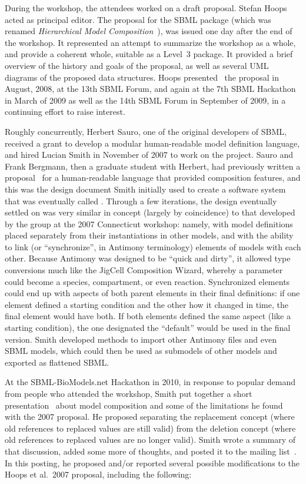 During the workshop, the attendees worked on a draft proposal.  Stefan
Hoops acted as principal editor.  The proposal for the SBML package
(which was renamed \emph{Hierarchical Model
  Composition}~\citep{hoops:2007}), was issued one day after the end of
the workshop.  It represented an attempt to summarize the workshop as a
whole, and provide a coherent whole, suitable as a Level~3 package.  It
provided a brief overview of the history and goals of the proposal, as
well as several UML diagrams of the proposed data structures.  Hoops
presented~\citep{hoops:2008} the proposal in August, 2008, at the 13th
SBML Forum, and again at the 7th SBML Hackathon in March of 2009 as well
as the 14th SBML Forum in September of 2009, in a continuing effort to
raise interest.

Roughly concurrently, Herbert Sauro, one of the original developers of
SBML, received a grant to develop a modular human-readable model
definition language, and hired Lucian Smith in November of 2007 to work
on the project.  Sauro and Frank Bergmann, then a graduate student with
Herbert, had previously written a proposal~\citep{bergmann:2006} for a
human-readable language that provided composition features, and this was
the design document Smith initially used to create a software system
that was eventually called
. Through a few
iterations, the design eventually settled on was very similar in concept
(largely by coincidence) to that developed by the group at the 2007
Connecticut workshop: namely, with model definitions placed separately
from their instantiations in other models, and with the ability to link
(or ``synchronize'', in Antimony terminology) elements of models with
each other.  Because Antimony was designed to be ``quick and dirty'', it
allowed type conversions much like the JigCell Composition Wizard,
whereby a parameter could become a species, compartment, or even
reaction.  Synchronized elements could end up with aspects of both
parent elements in their final definitions: if one element defined a
starting condition and the other how it changed in time, the final
element would have both.  If both elements defined the same aspect (like
a starting condition), the one designated the ``default'' would be used
in the final version.  Smith developed methods to import other Antimony
files and even SBML models, which could then be used as submodels of
other models and exported as flattened SBML.

At the SBML-BioModels.net Hackathon in 2010, in response to popular
demand from people who attended the workshop, Smith put together a short
presentation~\citep{smith:2010} about model composition and some of the
limitations he found with the 2007 proposal.  He proposed separating the
replacement concept (where old references to replaced values are still
valid) from the deletion concept (where old references to replaced
values are no longer valid).  Smith wrote a summary of that discussion,
added some more of thoughts, and posted it to the
 mailing
list~\citep{smith:2010b}.  In this posting, he proposed and/or reported
several possible modifications to the Hoops et al.\ 2007 proposal,
including the following:

